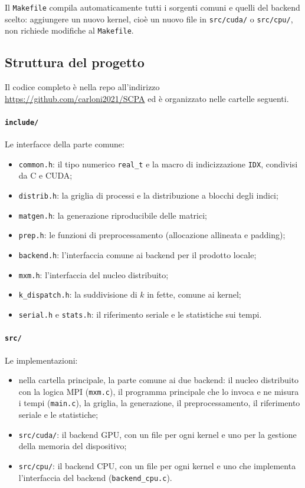 \documentclass[11pt,a4paper]{article}
\newcommand{\repourl}{\url{https://github.com/carloni2021/SCPA}}
\begin{document}
Il \texttt{Makefile} compila automaticamente tutti i sorgenti comuni e quelli
del backend scelto: aggiungere un nuovo kernel, cioè un nuovo file in
\texttt{src/cuda/} o \texttt{src/cpu/}, non richiede modifiche al
\texttt{Makefile}.

\subsection{Struttura del progetto}\label{sec:struttura}

Il codice completo è nella repo all'indirizzo \repourl{} ed è organizzato
nelle cartelle seguenti.

\paragraph{\texttt{include/}} Le interfacce della parte comune:
\begin{itemize}
  \item \texttt{common.h}: il tipo numerico \texttt{real\_t} e la macro di
        indicizzazione \texttt{IDX}, condivisi da C e CUDA;
  \item \texttt{distrib.h}: la griglia di processi e la distribuzione a
        blocchi degli indici;
  \item \texttt{matgen.h}: la generazione riproducibile delle matrici;
  \item \texttt{prep.h}: le funzioni di preprocessamento (allocazione
        allineata e padding);
  \item \texttt{backend.h}: l'interfaccia comune ai backend per il prodotto
        locale;
  \item \texttt{mxm.h}: l'interfaccia del nucleo distribuito;
  \item \texttt{k\_dispatch.h}: la suddivisione di $k$ in fette, comune ai
        kernel;
  \item \texttt{serial.h} e \texttt{stats.h}: il riferimento seriale e le
        statistiche sui tempi.
\end{itemize}

\paragraph{\texttt{src/}} Le implementazioni:
\begin{itemize}
  \item nella cartella principale, la parte comune ai due backend: il
        nucleo distribuito con la logica MPI (\texttt{mxm.c}), il programma
        principale che lo invoca e ne misura i tempi (\texttt{main.c}), la
        griglia, la generazione, il preprocessamento, il riferimento seriale e
        le statistiche;
  \item \texttt{src/cuda/}: il backend GPU, con un file per ogni kernel e uno
        per la gestione della memoria del dispositivo;
  \item \texttt{src/cpu/}: il backend CPU, con un file per ogni kernel e uno
        che implementa l'interfaccia del backend (\texttt{backend\_cpu.c}).
\end{itemize}
\end{document}
